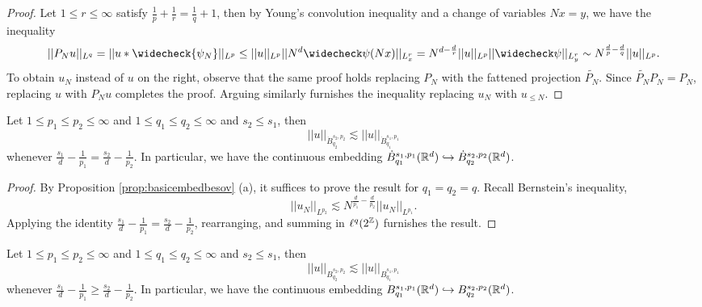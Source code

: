 \begin{proof}
	Let $1 \leq r \leq \infty$ satisfy $\tfrac1p + \tfrac1r = \tfrac1q + 1$, then by Young's convolution inequality and a change of variables $Nx = y$, we have the inequality
	\begin{align*}
		|| P_N u ||_{L^q} = || u * \widecheck{\psi_N} ||_{L^p} \leq ||u||_{L^p} ||N^d \widecheck \psi(Nx)||_{L^r_x} = N^{d - \frac{d}{r}} ||u||_{L^p} ||\widecheck \psi ||_{L^r_y} \sim N^{\frac{d}{p} - \frac{d}{q}} ||u||_{L^p}.
	\end{align*}
	To obtain $u_N$ instead of $u$ on the right, observe that the same proof holds replacing $P_N$ with the fattened projection $\widetilde{P_N}$. Since $\widetilde{P_N} P_N = P_N$, replacing $u$ with $P_N u$ completes the proof. Arguing similarly furnishes the inequality replacing $u_N$ with $u_{\leq N}$. 
\end{proof}



\begin{theorem}
	Let $1 \leq p_1 \leq p_2 \leq \infty$ and $1 \leq q_1 \leq q_2 \leq \infty$ and $s_2 \leq s_1$, then 
		\[ || u ||_{\dot B^{s_2, p_2}_{q_2}} \lesssim || u ||_{\dot B^{s_1, p_1}_{q_1}} \]
	whenever $\frac{s_1}{d} - \frac{1}{p_1} = \frac{s_2}{d} - \frac{1}{p_2}$. In particular, we have the continuous embedding $\dot B^{s_1, p_1}_{q_1} (\mathbb R^d) \hookrightarrow \dot B^{s_2, p_2}_{q_2} (\mathbb R^d)$.
\end{theorem}

\begin{proof}
	By Proposition \ref{prop:basicembedbesov} (a), it suffices to prove the result for $q_1 = q_2 = q$. Recall Bernstein's inequality, 
		\[ || u_N||_{L^{p_2}} \lesssim N^{\frac{d}{p_1} - \frac{d}{p_2}} ||u_N||_{L^{p_1}}. \]
	Applying the identity $\frac{s_1}{d} - \frac{1}{p_1} = \frac{s_2}{d} - \frac{1}{p_2}$, rearranging, and summing in $\ell^q (2^\mathbb Z)$ furnishes the result. 	
\end{proof}

\begin{theorem}
	Let $1 \leq p_1 \leq p_2 \leq \infty$ and $1 \leq q_1 \leq q_2 \leq \infty$ and $s_2 \leq s_1$, then 
		\[ || u ||_{B^{s_2, p_2}_{q_2}} \lesssim || u ||_{B^{s_1, p_1}_{q_1}} \]
	whenever $\frac{s_1}{d} - \frac{1}{p_1} \geq \frac{s_2}{d} - \frac{1}{p_2}$. In particular, we have the continuous embedding $B^{s_1, p_1}_{q_1} (\mathbb R^d) \hookrightarrow B^{s_2, p_2}_{q_2} (\mathbb R^d)$.
\end{theorem}

